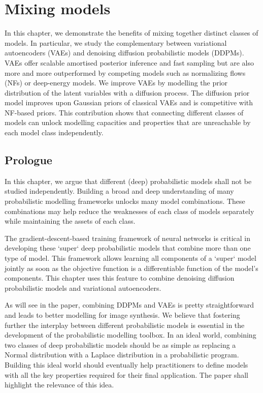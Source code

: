 \chapter{Mixing models}\label{ch:03}

\begin{chapter_outline}

  In this chapter, we demonstrate the benefits of mixing together distinct classes of models. In particular, we study the complementary between variational autoencoders (VAEs) and denoising diffusion probabilistic models (DDPMs). VAEs offer scalable amortised posterior inference and fast sampling but are also more and more outperformed by competing models such as normalizing flows (NFs) or deep-energy models. We improve VAEs by modelling the prior distribution of the latent variables with a diffusion process. The diffusion prior model improves upon Gaussian priors of classical VAEs and is competitive with NF-based priors.
  This contribution shows that connecting different classes of models can unlock modelling capacities and properties that are unreachable by each model class independently.
\end{chapter_outline}
\section{Prologue}
In this chapter, we argue that different (deep) probabilistic models shall not be studied independently. Building a broad and deep understanding of many probabilistic modelling frameworks unlocks many model combinations. These combinations may help reduce the weaknesses of each class of models separately while maintaining the assets of each class.

The gradient-descent-based training framework of neural networks is critical in developing these `super` deep probabilistic models that combine more than one type of model. This framework allows learning all components of a `super` model jointly as soon as the objective function is a differentiable function of the model's components. This chapter uses this feature to combine denoising diffusion probabilistic models and variational autoencoders.

As will see in the paper, combining DDPMs and VAEs is pretty straightforward and leads to better modelling for image synthesis. We believe that fostering further the interplay between different probabilistic models is essential in the development of the probabilistic modelling toolbox. In an ideal world, combining two classes of deep probabilistic models should be as simple as replacing a Normal distribution with a Laplace distribution in a probabilistic program. Building this ideal world should eventually help practitioners to define models with all the key properties required for their final application. The paper shall highlight the relevance of this idea.

